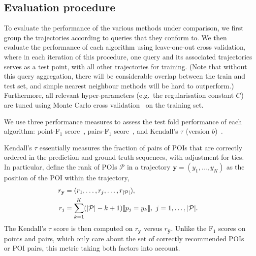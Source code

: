 %
\subsection{Evaluation procedure}

To evaluate the performance of the various methods under comparison,
we first group the trajectories according to queries that they conform to.
We then evaluate the performance of each algorithm using leave-one-out cross validation,
where in each iteration of this procedure,
one query and its associated trajectories serves as a test point, with all other trajectories for training.
(Note that without this query aggregation, there will be considerable overlap between the train and test set, and simple nearest neighbour methods will be hard to outperform.)
Furthermore, 
all relevant hyper-parameters (e.g.\ the regularisation constant $C$) are tuned using Monte Carlo cross validation~\cite{burman1989comparative} on the training set.

We use three performance measures to assess the test fold performance of each algorithm:
point-F$_1$ score~\cite{ijcai15},
pairs-F$_1$ score~\cite{cikm16paper},
and
Kendall's $\tau$ (version $b$)~\cite{kendall1945,agresti2010analysis}.

Kendall's $\tau$
essentially measures the fraction of pairs of POIs that are correctly ordered in the prediction and ground truth sequences,
with adjustment for ties.
In particular,
define the rank of POIs $\mathcal{P}$ in a trajectory $\mathbf{y} = (y_1,\dots,y_K)$ as
the position of the POI within the trajectory,
\begin{align*} 
r_\mathbf{y} &= (r_1,\dots,r_j,\dots,r_{|\mathcal{P}|}), \\
r_j &= \sum_{k=1}^K (| \mathcal{P} | - k + 1)  \llbracket p_j = y_k \rrbracket, ~ j = 1, \dots, | \mathcal{P} |.
\end{align*}
The Kendall's $\tau$ score is then computed on $r_\mathbf{y}$ versus $r_\mathbf{\hat{y}}$.
Unlike the F$_1$ scores on points and pairs, 
which only care about the set of correctly recommended POIs or POI pairs,
this metric taking both factors into account.

